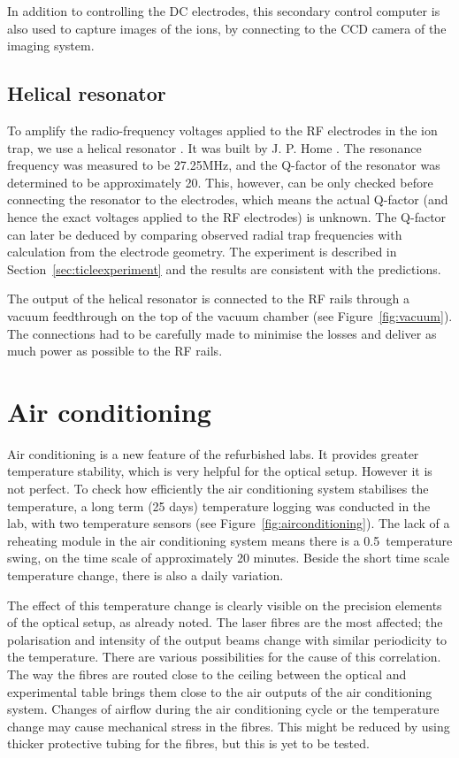 In addition to controlling the DC electrodes, this secondary control computer is also used to capture images of the ions, by connecting to the CCD camera of the imaging system. 




\subsection{Helical resonator}
\label{sec:helicalresonator}
To amplify the radio-frequency voltages applied to the RF electrodes in the ion trap, we use a helical resonator \cite{McAlpine1959}. It was built by J. P. Home \cite{Home2005}. The resonance frequency was measured to be 27.25MHz, and the Q-factor of the resonator was determined to be approximately 20. This, however, can be only checked before connecting the resonator to the electrodes, which means the actual Q-factor (and hence the exact voltages applied to the RF electrodes) is unknown.  The Q-factor can later be deduced by comparing observed radial trap frequencies with calculation from the electrode geometry. The experiment is described in Section~\ref{sec:ticleexperiment} and the results are consistent with the predictions.

The output of the helical resonator is connected to the RF rails through a vacuum feedthrough on the top of the vacuum chamber (see Figure~\ref{fig:vacuum}).  The connections had to be carefully made to minimise the losses and deliver as much power as possible to the RF rails.


\section{Air conditioning}
\label{sec:aircond}

Air conditioning is a new feature of the refurbished labs. It provides greater temperature stability, which is very helpful for the optical setup. However it is not perfect. To check how efficiently the air conditioning system stabilises the temperature, a long term (25 days) temperature logging was conducted in the lab, with two temperature sensors (see Figure~\ref{fig:airconditioning}). The lack of a reheating module in the air conditioning system means there is a 0.5\degree\, temperature swing, on the time scale of approximately 20 minutes. Beside the short time scale temperature change, there is also a daily variation. 

The effect of this temperature change is clearly visible on the precision elements of the optical setup, as already noted. The laser fibres are the most affected; the polarisation and intensity of the output beams change with similar periodicity to the temperature. There are various possibilities for the cause of this correlation. The way the fibres are routed close to the ceiling between the optical and experimental table brings them close to the air outputs of the air conditioning system. Changes of airflow during the air conditioning cycle or the temperature change may cause mechanical stress in the fibres. This might be reduced by using thicker protective tubing for the fibres, but this is yet to be tested.

